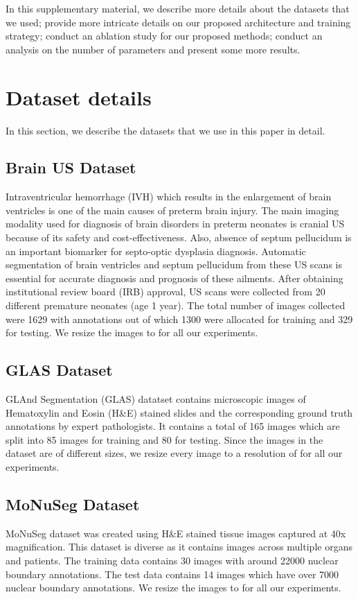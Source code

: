 \documentclass[runningheads]{llncs}
\begin{document}
	In this supplementary material, we describe more details about the datasets that we used; provide more intricate details on our proposed architecture and training strategy; conduct an ablation study for our proposed methods; conduct an analysis on the number of parameters and present some more results.
	
	\section{Dataset details}
	
	In this section, we describe the datasets that we use in this paper in detail.
	\subsection{Brain US Dataset} Intraventricular hemorrhage (IVH) which results in the enlargement of brain ventricles is one of the main causes of preterm brain injury. The main imaging modality used for diagnosis of brain disorders in preterm neonates is cranial US because of its safety and cost-effectiveness. Also, absence of septum pellucidum is an important biomarker for septo-optic dysplasia diagnosis. Automatic segmentation of brain ventricles and septum pellucidum from these US scans is essential for accurate diagnosis and prognosis of these ailments. After obtaining institutional review board (IRB) approval, US scans were collected from 20 different premature neonates (age  1 year). The total number of images collected were 1629 with annotations out of which 1300 were allocated for training and 329 for testing. We resize the images to  for all our experiments.
	
	
	
	\subsection{GLAS Dataset} GLAnd Segmentation (GLAS) datatset \cite{sirinukunwattana2017gland} contains microscopic images of Hematoxylin and Eosin (H\&E) stained slides and the corresponding ground truth annotations by expert pathologists. It contains a total of 165 images which are split into 85 images for training and 80 for testing. Since the images in the dataset are of different sizes, we resize every image to a resolution of  for all our experiments. 
	
	\subsection{MoNuSeg Dataset} MoNuSeg dataset \cite{kumar2019multi,kumar2017dataset} was created using H\&E stained tissue images captured at 40x magnification. This dataset is diverse as it contains images across multiple organs and patients. The training data contains 30 images with around 22000 nuclear boundary annotations. The test data contains 14 images which have over 7000 nuclear boundary annotations. We resize the images to  for all our experiments.
	
\end{document}
